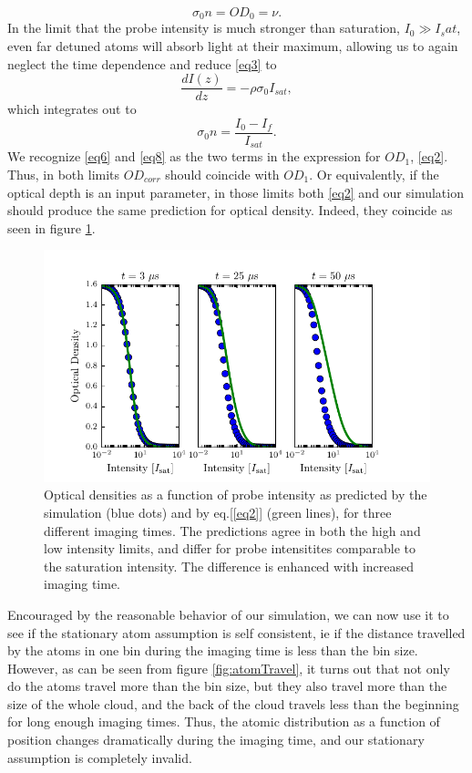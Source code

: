 \documentclass[12pt]{iopart}
\begin{document}
\begin{equation}
\sigma_0 n = OD_0 = \nu. \label{eq6}
\end{equation}
In the limit that the probe intensity is much stronger than saturation, $I_0\gg I_sat$, even far detuned atoms will absorb light at their maximum, allowing us to again neglect the time dependence and reduce \ref{eq3} to 
\begin{equation}
\frac{dI(z)}{dz}=-\rho\sigma_0 I_{sat}, 
\end{equation}
which integrates out to 
\begin{equation}
\sigma_0 n = \frac{I_0 - I_f}{I_{sat}}. \label{eq8}
\end{equation}
We recognize \ref{eq6} and \ref{eq8} as the two terms in the expression for $OD_1$, \ref{eq2}. Thus, in both limits $OD_{corr}$ should coincide with $OD_1$. Or equivalently, if the optical depth is an input parameter, in those limits both \ref{eq2} and our simulation should produce the same prediction for optical density. Indeed, they coincide as seen in figure \ref{fig:IsatLimits}.
\begin{figure}
	\includegraphics{figure3.pdf}
\caption{Optical densities as a function of probe intensity as predicted by the simulation (blue dots) and by eq.[\ref{eq2}] (green lines), for three different imaging times. The predictions agree in both the high and low intensity limits, and differ for probe intensitites comparable to the saturation intensity. The difference is enhanced with increased imaging time.}  
\label{fig:IsatLimits}
\end{figure}
\par Encouraged by the reasonable behavior of our simulation, we can now use it to see if the stationary atom assumption is self consistent, ie if the distance travelled by the atoms in one bin during the imaging time is less than the bin size. However, as can be seen from figure \ref{fig:atomTravel}, it turns out that not only do the atoms travel more than the bin size, but they also travel more than the size of the whole cloud, and the back of the cloud travels less than the beginning for long enough imaging times. Thus, the atomic distribution as a function of position changes dramatically during the imaging time, and our stationary assumption is completely invalid. 
\end{document}
